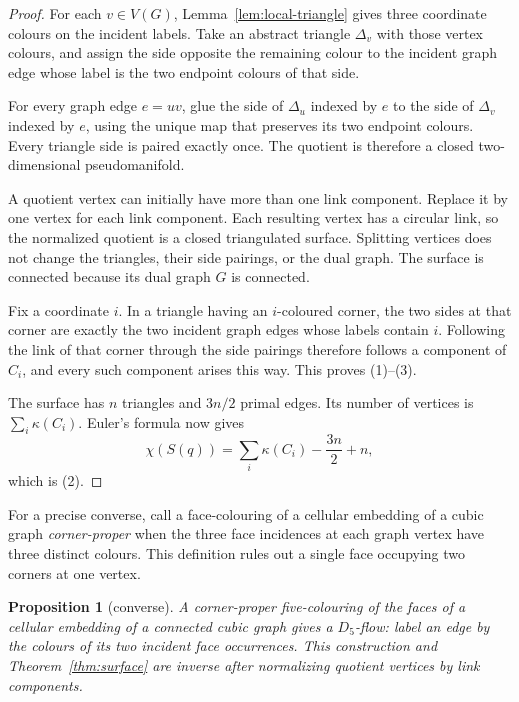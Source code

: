 \documentclass[11pt]{article}
\newtheorem{proposition}[theorem]{Proposition}
\theoremstyle{definition}
\theoremstyle{remark}
\newcommand{\kap}{\kappa}
\begin{document}
\begin{proof}
For each \(v\in V(G)\), Lemma~\ref{lem:local-triangle} gives three
coordinate colours on the incident labels.  Take an abstract triangle
\(\Delta_v\) with those vertex colours, and assign the side opposite the
remaining colour to the incident graph edge whose label is the two
endpoint colours of that side.

For every graph edge \(e=uv\), glue the side of \(\Delta_u\) indexed by
\(e\) to the side of \(\Delta_v\) indexed by \(e\), using the unique map
that preserves its two endpoint colours.  Every triangle side is paired
exactly once.  The quotient is therefore a closed two-dimensional
pseudomanifold.

A quotient vertex can initially have more than one link component.
Replace it by one vertex for each link component.  Each resulting vertex
has a circular link, so the normalized quotient is a closed triangulated
surface.  Splitting vertices does not change the triangles, their side
pairings, or the dual graph.  The surface is connected because its dual
graph \(G\) is connected.

Fix a coordinate \(i\).  In a triangle having an \(i\)-coloured corner,
the two sides at that corner are exactly the two incident graph edges
whose labels contain \(i\).  Following the link of that corner through the
side pairings therefore follows a component of \(C_i\), and every such
component arises this way.  This proves (1)--(3).

The surface has \(n\) triangles and \(3n/2\) primal edges.  Its number of
vertices is \(\sum_i\kap(C_i)\).  Euler's formula now gives
\[
 \chi(S(q))=\sum_i\kap(C_i)-\frac{3n}{2}+n,
\]
which is (2).
\end{proof}

For a precise converse, call a face-colouring of a cellular embedding of
a cubic graph \emph{corner-proper} when the three face incidences at each
graph vertex have three distinct colours.  This definition rules out a
single face occupying two corners at one vertex.

\begin{proposition}[converse]\label{prop:surface-converse}
A corner-proper five-colouring of the faces of a cellular embedding of a
connected cubic graph gives a \(D_5\)-flow: label an edge by the colours of
its two incident face occurrences.  This construction and
Theorem~\ref{thm:surface} are inverse after normalizing quotient vertices
by link components.
\end{proposition}
\end{document}
